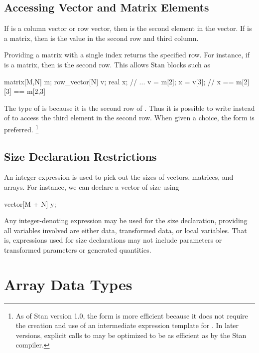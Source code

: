 \subsection{Accessing Vector and Matrix Elements}

If  is a column vector or row vector, then  is the
second element in the vector.  If  is a matrix, then
 is the value in the second row and third column.

Providing a matrix with a single index returns the specified row.  For
instance, if  is a matrix, then  is the second row.
This allows Stan blocks such as
%
\begin{stancode}
matrix[M,N] m;
row_vector[N] v;
real x;
// ...
v = m[2];
x = v[3];   // x == m[2][3] == m[2,3]
\end{stancode}
%
The type of  is  because it is the second
row of .  Thus it is possible to write  instead
of  to access the third element in the second row.  When
given a choice, the form  is preferred.%
%
\footnote{As of Stan version 1.0, the form
   is more efficient because it does not require the
  creation and use of an intermediate expression template for
  .  In later versions, explicit calls to 
  may be optimized to be as efficient as  by the Stan
  compiler.\label{array-index-style.footnote}}


\subsection{Size Declaration Restrictions}

An integer expression is used to pick out the sizes of vectors,
matrices, and arrays.  For instance, we can declare a vector of size
 using
%
\begin{stancode}
vector[M + N] y;
\end{stancode}
%
Any integer-denoting expression may be used for the size declaration,
providing all variables involved are either data, transformed data, or
local variables.  That is, expressions used for size declarations may
not include parameters or transformed parameters or generated
quantities.

\section{Array Data Types}\label{array-data-types.section}


